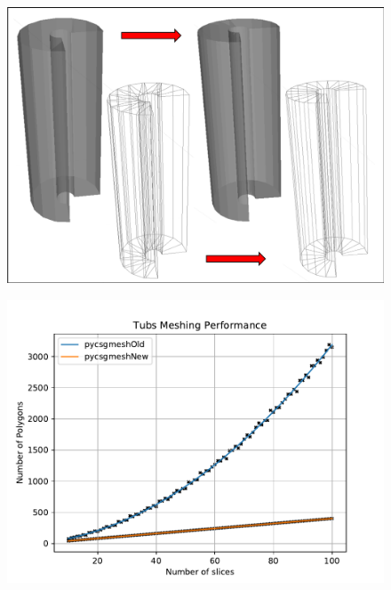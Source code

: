 \documentclass[12pt,a4paper]{article}
\begin{document}
\begin{figure}[h!]
\centering
\begin{minipage}{.2\textwidth}
  \centering
  \includegraphics[height=0.7\linewidth]{Images//Meshes//tubs.png}
  \label{fig:test1}
\end{minipage}%
\begin{minipage}{.3\textwidth}
  \centering
  \includegraphics[scale=0.35]{Images//Quad_fits//Tubs_quad.pdf}
  \label{fig:test2}
\end{minipage}%
\end{figure}

\endgroup
\end{document}
